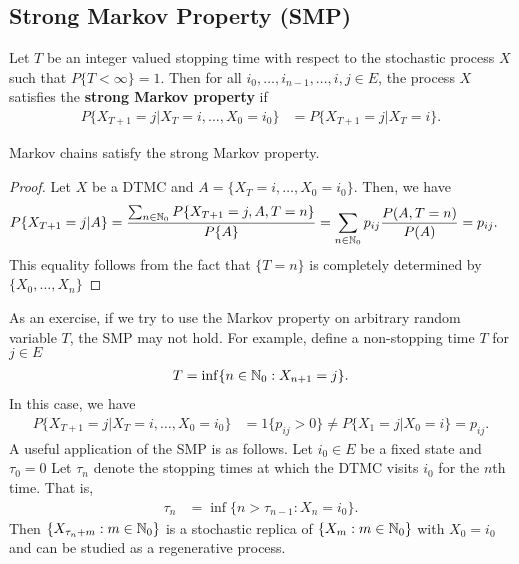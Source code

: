 \documentclass[a4paper,10pt,english]{article}
\begin{document}
\subsection{Strong Markov Property (SMP)}
Let $T$ be an integer valued stopping time with respect to the stochastic process $X$ such that $P\{T< \infty\}=1$. 
Then for all $i_0, \dots, i_{n-1},\dots, i,j \in E$, the process $X$ satisfies the \textbf{strong Markov property} if 
\begin{align*}
P\{X_{T+1} = j|X_{T} = i, \dots,X_0 =i_0\} &= P\{X_{T+1} = j|X_{T} = i\}.
\end{align*}
\begin{lem}
Markov chains satisfy the strong Markov property. 
\end{lem}
\begin{proof}
Let $X$ be a DTMC and $A = \{X_{T} = i, \dots, X_0 =i_0\}$. 
Then, we have 
\begin{align*}
P\{X_{T+1} = j|A\} &=\frac{\sum_{n \in \N_0}P\{X_{T+1}=j, A, T = n\}}{P\{A\}} %
= \sum_{n \in \N_0} p_{ij}\frac{P(A, T =n)}{P(A)} = p_{ij}.
\end{align*}
This equality follows from the fact that $\{T = n\}$ is completely determined by $\{X_0, \dots, X_n\}$
\end{proof}
As an exercise, if we try to use the Markov property on arbitrary random variable $T$, the SMP may not hold. 
For example, define a non-stopping time $T$ for $j \in E$
\begin{align*}
T=\inf \{n \in \mathbb{N}_0: X_{n+1}=j\}.
\end{align*}
In this case, we have 
\begin{align*}
P\{X_{T+1}=j|X_T=i,\dots, X_0 = i_0\}&= 1\{p_{ij} > 0\} \neq  P \{X_1=j |X_0=i\} = p_{ij}.
\end{align*}
A useful application of the SMP is as follows. 
Let $i_0 \in E$ be a fixed state and $\tau_0 = 0$
Let $\tau_n$ denote the stopping times at which the DTMC visits $i_0$ for the $n$th time. 
That is,
\begin{align*} 
\tau_n &= \inf\{n > \tau_{n-1}: X_n = i_0\}. 
\end{align*}
Then $\{X_{\tau_n + m}: m \in \mathbb{N}_0\}$ is a stochastic replica of $\{X_m: m \in \mathbb{N}_0\}$ with $X_0 = i_0$ and can be studied as a regenerative process. 
\end{document}
